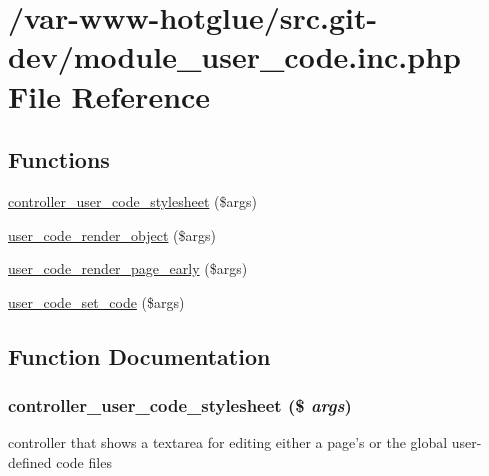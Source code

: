 \hypertarget{module__user__code_8inc_8php}{
\section{/var-\/www-\/hotglue/src.git-\/dev/module\_\-user\_\-code.inc.php File Reference}
\label{module__user__code_8inc_8php}
}
\subsection*{Functions}
\begin{DoxyCompactItemize}
\item 
\hyperlink{module__user__code_8inc_8php_ada93b4078c8aa85c4b2bd3709501922b}{controller\_\-user\_\-code\_\-stylesheet} (\$args)
\item 
\hyperlink{module__user__code_8inc_8php_ae2a601394f96c69bb105d73774d2aa29}{user\_\-code\_\-render\_\-object} (\$args)
\item 
\hyperlink{module__user__code_8inc_8php_ac616caa2e8476e976c51e8b833e6d55b}{user\_\-code\_\-render\_\-page\_\-early} (\$args)
\item 
\hyperlink{module__user__code_8inc_8php_a788372f1e959532d09dceb63209507cb}{user\_\-code\_\-set\_\-code} (\$args)
\end{DoxyCompactItemize}


\subsection{Function Documentation}
\hypertarget{module__user__code_8inc_8php_ada93b4078c8aa85c4b2bd3709501922b}{
\subsubsection[{controller\_\-user\_\-code\_\-stylesheet}]{\setlength{\rightskip}{0pt plus 5cm}controller\_\-user\_\-code\_\-stylesheet (\$ {\em args})}}
\label{module__user__code_8inc_8php_ada93b4078c8aa85c4b2bd3709501922b}
controller that shows a textarea for editing either a page's or the global user-\/defined code files 


